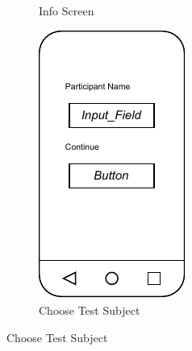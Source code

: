 \begin{figure}
\begin{subfigure}[b]{0.25\textwidth}
        \caption{Info Screen}
        \label{subfig:InfoScreen}
    \end{subfigure}
    \hspace{1cm}
    \begin{subfigure}[b]{0.25\textwidth}
        \centering
        \includegraphics[width=\textwidth]{content/05_design_and_dev_artefacts/ActivityParticipantChoose.drawio.pdf}
        \caption{Choose Test Subject}
        \label{subfig:chooseTestSubject}

\end{subfigure}
\end{figure}
